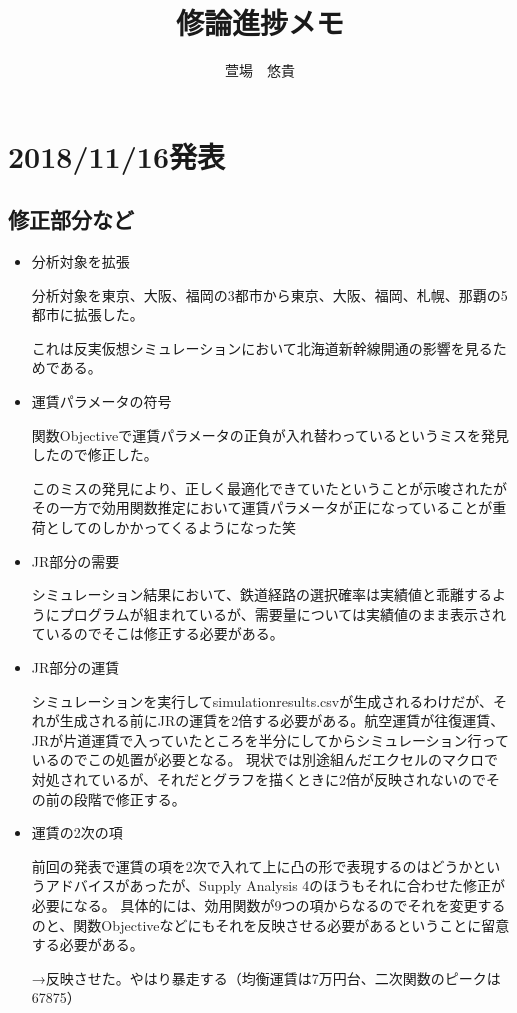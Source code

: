 \documentclass{jsarticle}
\begin{document}
\title{修論進捗メモ}
\author{萱場　悠貴}
\maketitle

\section{2018/11/16発表}
\subsection{修正部分など}
\begin{itemize} %
\item 分析対象を拡張

分析対象を東京、大阪、福岡の3都市から東京、大阪、福岡、札幌、那覇の5都市に拡張した。

これは反実仮想シミュレーションにおいて北海道新幹線開通の影響を見るためである。

\item 運賃パラメータの符号

関数Objectiveで運賃パラメータの正負が入れ替わっているというミスを発見したので修正した。

このミスの発見により、正しく最適化できていたということが示唆されたがその一方で効用関数推定において運賃パラメータが正になっていることが重荷としてのしかかってくるようになった笑

\item JR部分の需要

シミュレーション結果において、鉄道経路の選択確率は実績値と乖離するようにプログラムが組まれているが、需要量については実績値のまま表示されているのでそこは修正する必要がある。

\item JR部分の運賃

シミュレーションを実行してsimulationresults.csvが生成されるわけだが、それが生成される前にJRの運賃を2倍する必要がある。航空運賃が往復運賃、JRが片道運賃で入っていたところを半分にしてからシミュレーション行っているのでこの処置が必要となる。
現状では別途組んだエクセルのマクロで対処されているが、それだとグラフを描くときに2倍が反映されないのでその前の段階で修正する。

\item 運賃の2次の項

前回の発表で運賃の項を2次で入れて上に凸の形で表現するのはどうかというアドバイスがあったが、Supply Analysis 4のほうもそれに合わせた修正が必要になる。
具体的には、効用関数が9つの項からなるのでそれを変更するのと、関数Objectiveなどにもそれを反映させる必要があるということに留意する必要がある。

→反映させた。やはり暴走する（均衡運賃は7万円台、二次関数のピークは67875）

\end{itemize}
\end{document}

